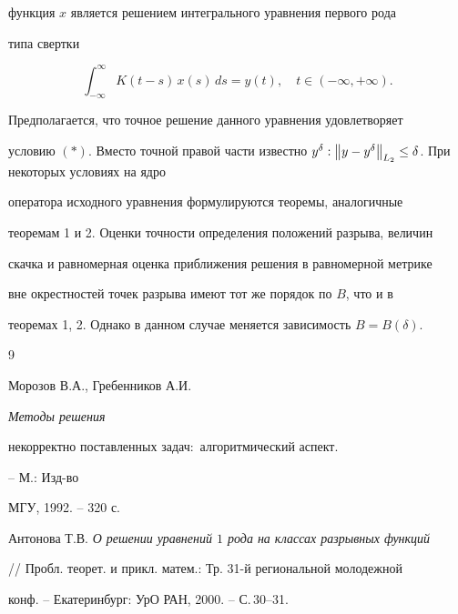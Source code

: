 функция $x$ является решением интегрального уравнения первого рода


типа свертки


$$


\int_{-\infty}^{\infty}K(t-s)


\,x(s)\,ds=y(t),\quad t\in (-\infty,+\infty).


$$


Предполагается, что точное решение данного уравнения удовлетворяет


условию $(*)$. Вместо точной правой части известно $y^{\delta}:


\norm{y-y^{\delta}}_{L_2}\leq \delta$. При некоторых условиях на ядро


оператора исходного уравнения формулируются теоремы, аналогичные


теоремам 1 и 2. Оценки точности определения положений разрыва, величин


скачка и равномерная оценка приближения решения в равномерной метрике


вне окрестностей точек разрыва имеют тот же порядок по $B$, что и в


теоремах 1, 2. Однако в данном случае меняется зависимость $B=B(\delta)$.





\begin{thebibliography}{9}







Морозов В.А., Гребенников А.И. {\it Методы решения


некорректно поставленных задач$:$ алгоритмический аспект.} -- М.: Изд-во


МГУ, 1992. -- 320 с.




Антонова Т.В. {\it О решении уравнений $1$ рода на классах разрывных функций}


// Пробл. теорет. и прикл. матем.: Тр. 31-й региональной молодежной


конф. -- Екатеринбург: УрО РАН, 2000. -- С.\,30--31.





\end{thebibliography}





\vskip 2cm











\label{end}





